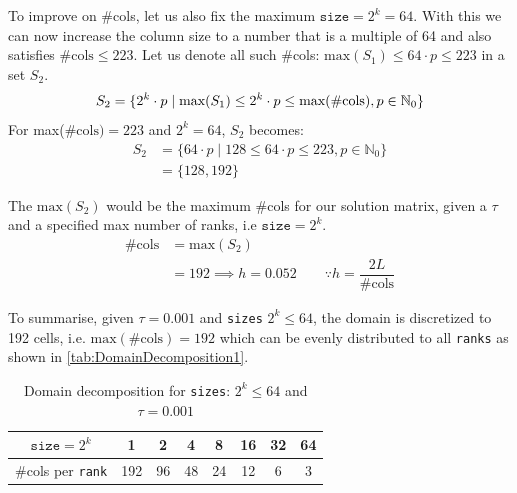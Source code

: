 To improve on \#cols, let us also fix the maximum $\texttt{size}=2^k=64$. With this we can now increase the column size to a number that is a multiple of 64 and also satisfies $\#\text{cols}\leq223$. Let us denote all such \#cols: $\text{max}(S_1) \leq 64\cdot p \leq 223$ in a set $S_2$. 
\begin{equation}
    \begin{aligned}
        S_2 = \{2^k \cdot p \mid \text{max}(S_1) \leq 2^k \cdot p \leq \text{max(\#\text{cols})},p \in \mathbb{N}_0\}
    \end{aligned}
\end{equation}
For max($\#\text{cols})=223$ and $2^k=64$, $S_2$ becomes:
\begin{equation}
    \begin{aligned}
        S_2 &= \{64 \cdot p \mid 128 \leq 64\cdot p \leq 223,p \in \mathbb{N}_0\} \\
        &= \{128, 192\}
    \end{aligned}
    \label{eq:ddt32}
\end{equation}

The $\text{max}(S_2)$ would be the maximum \#cols for our solution matrix, given a $\tau$ and a specified max number of ranks, i.e $\texttt{size}=2^k$.
\begin{equation}
    \begin{aligned}
        \#\text{cols} &= \text{max}(S_2) \\
         &= 192 \implies h = 0.052 \quad\quad \because  h=\dfrac{2L}{\text{\#cols}}
    \end{aligned}
\end{equation}

To summarise, given $\tau=0.001$ and \texttt{sizes} $2^{k} \leq 64$, the domain is discretized to 192 cells, i.e. $\text{max}(\#\text{cols})=192$ which can be evenly distributed to all \texttt{ranks} as shown in \autoref{tab:DomainDecomposition1}.

\begin{table}[H]
    \centering
    \begin{tabular}{|c|c|c|c|c|c|c|c|}
        \hline
        $\texttt{size}=2^k$ & 1 & 2 & 4 & 8 & 16 & 32 & 64 \\
        \hline
        \#cols per \texttt{rank} & 192 & 96 & 48 & 24 & 12 & 6 & 3 \\
        \hline
    \end{tabular}
    \caption{Domain decomposition for \texttt{sizes}: $2^k\leq64$ and $\tau=0.001$}
    \label{tab:DomainDecomposition1}
\end{table}


